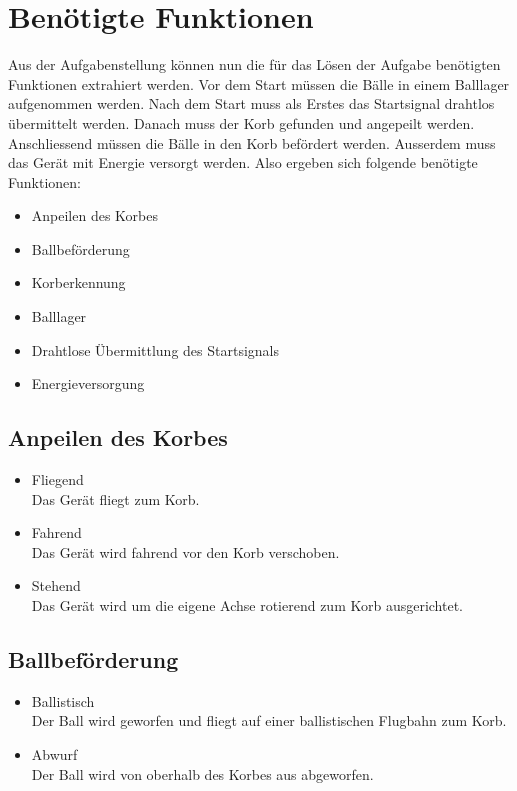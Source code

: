 \section{Benötigte Funktionen}
Aus der Aufgabenstellung können nun die für das Lösen der Aufgabe benötigten 
Funktionen extrahiert werden. Vor dem Start müssen die Bälle in einem Balllager 
aufgenommen werden. Nach dem Start muss als Erstes das Startsignal drahtlos 
übermittelt werden. Danach muss der Korb gefunden und angepeilt werden. 
Anschliessend müssen die Bälle in den Korb befördert werden. Ausserdem muss 
das Gerät mit Energie versorgt werden. Also ergeben sich folgende benötigte 
Funktionen: 
\begin{itemize}
    \item Anpeilen des Korbes
    \item Ballbeförderung
    \item Korberkennung
    \item Balllager
    \item Drahtlose Übermittlung des Startsignals
    \item Energieversorgung
\end{itemize}

\subsection{Anpeilen des Korbes}
\begin{itemize}
    \item Fliegend \\
        Das Gerät fliegt zum Korb. 
    \item Fahrend \\
        Das Gerät wird fahrend vor den Korb verschoben. 
    \item Stehend \\
        Das Gerät wird um die eigene Achse rotierend zum Korb ausgerichtet. 
\end{itemize}

\subsection{Ballbeförderung}
\begin{itemize}
    \item Ballistisch \\
        Der Ball wird geworfen und fliegt auf einer ballistischen Flugbahn zum 
        Korb. 
    \item Abwurf \\
        Der Ball wird von oberhalb des Korbes aus abgeworfen. 
\end{itemize}

